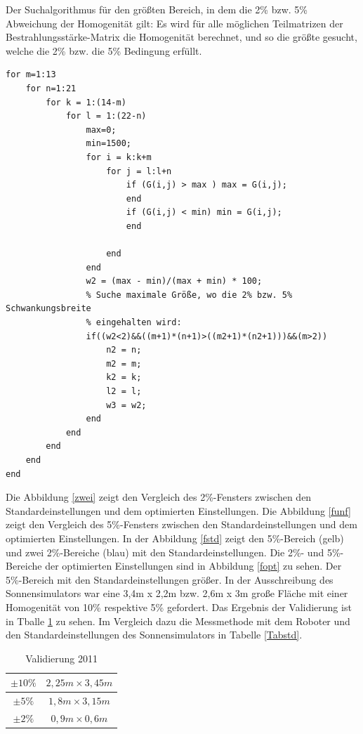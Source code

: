 \documentclass[a4paper,bibtotoc,oneside]{scrbook}
\begin{document}
Der Suchalgorithmus für den größten Bereich, in dem die 2\% bzw. 5\% Abweichung der Homogenität gilt: Es wird für alle möglichen Teilmatrizen der Bestrahlungsstärke-Matrix die Homogenität berechnet, und so die größte gesucht, welche die 2\% bzw. die 5\% Bedingung erfüllt.
\begin{verbatim}
for m=1:13
    for n=1:21
        for k = 1:(14-m)
            for l = 1:(22-n)
                max=0;
                min=1500;
                for i = k:k+m
                    for j = l:l+n
                        if (G(i,j) > max ) max = G(i,j);
                        end
                        if (G(i,j) < min) min = G(i,j);
                        end
                        
                    end
                end
                w2 = (max - min)/(max + min) * 100;
                % Suche maximale Größe, wo die 2% bzw. 5% Schwankungsbreite
                % eingehalten wird:
                if((w2<2)&&((m+1)*(n+1)>((m2+1)*(n2+1)))&&(m>2))
                    n2 = n;
                    m2 = m;
                    k2 = k;
                    l2 = l;
                    w3 = w2;
                end
            end
        end
    end
end
\end{verbatim}

Die Abbildung \ref{zwei} zeigt den Vergleich des 2\%-Fensters zwischen den Standardeinstellungen und dem optimierten Einstellungen.
Die Abbildung \ref{funf} zeigt den Vergleich des 5\%-Fensters zwischen den Standardeinstellungen und dem optimierten Einstellungen.
In der Abbildung \ref{fstd} zeigt den 5\%-Bereich (gelb) und zwei 2\%-Bereiche (blau) mit den Standardeinstellungen.
Die 2\%- und 5\%-Bereiche der optimierten Einstellungen sind in Abbildung \ref{fopt} zu sehen. Der 5\%-Bereich mit den Standardeinstellungen größer.
In der Ausschreibung des Sonnensimulators war eine 3,4m x 2,2m bzw. 2,6m x 3m große Fläche mit einer Homogenität von 10\% respektive 5\% gefordert. 
Das Ergebnis der Validierung ist in Tballe \ref{Tab11} zu sehen. Im Vergleich dazu die Messmethode mit dem Roboter und den Standardeinstellungen des Sonnensimulators in Tabelle \ref{Tabstd}.


\begin{table}[htbp]
\centering
\begin{tabular}{ | c | c |}\hline
$\pm 10\%$ & $2,25m \times 3,45m$  \\ \hline
$\pm 5\%$ & $1,8m \times 3,15m$    \\ \hline
$\pm 2\%$ & $0,9m \times 0,6m$     \\ \hline
\end{tabular}
\caption{Validierung 2011}\label{Tab11}
\end{table}
\end{document}
